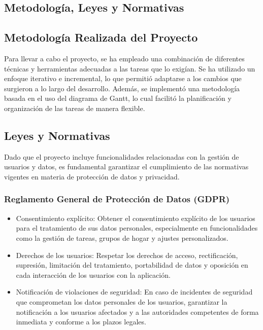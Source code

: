 \documentclass{article}
\begin{document}
    \clearpage
    \begin{flushleft}
    \justifying

\section{Metodolog\'ia, Leyes y Normativas}
\subsection{Metodolog\'ia Realizada del Proyecto}
Para llevar a cabo el proyecto, se ha empleado una combinaci\'on de diferentes t\'ecnicas y herramientas adecuadas a las tareas que lo exig\'ian. Se ha utilizado un enfoque iterativo e incremental, lo que permiti\'o adaptarse a los cambios que surgieron a lo largo del desarrollo. Adem\'as, se implement\'o una metodolog\'ia basada en el uso del diagrama de Gantt, lo cual facilit\'o la planificaci\'on y organizaci\'on de las tareas de manera flexible.

\subsection{Leyes y Normativas}
Dado que el proyecto incluye funcionalidades relacionadas con la gesti\'on de usuarios y datos, es fundamental garantizar el cumplimiento de las normativas vigentes en materia de protecci\'on de datos y privacidad.

\subsubsection*{Reglamento General de Protecci\'on de Datos (GDPR)}
\begin{itemize}
    \item Consentimiento expl\'icito: Obtener el consentimiento expl\'icito de los usuarios para el tratamiento de sus datos personales, especialmente en funcionalidades como la gesti\'on de tareas, grupos de hogar y ajustes personalizados.

    \item Derechos de los usuarios: Respetar los derechos de acceso, rectificaci\'on, supresi\'on, limitaci\'on del tratamiento, portabilidad de datos y oposici\'on en cada interacci\'on de los usuarios con la aplicaci\'on.

    \item Notificaci\'on de violaciones de seguridad: En caso de incidentes de seguridad que comprometan los datos personales de los usuarios, garantizar la notificaci\'on a los usuarios afectados y a las autoridades competentes de forma inmediata y conforme a los plazos legales.
\end{itemize}


\end{flushleft}
\end{document}
